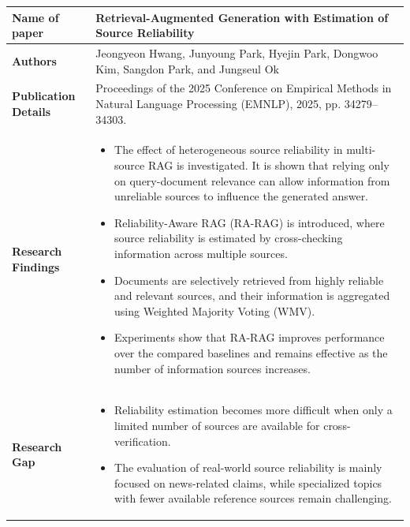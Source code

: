 \documentclass[12pt,a4paper]{report}
\begin{document}
\begin{longtable}{|p{1.25in}|p{5.15in}|}

\hline

\textbf{Name of paper} &
\textbf{Retrieval-Augmented Generation with Estimation of Source Reliability}
\\ \hline

\textbf{Authors} &
Jeongyeon Hwang, Junyoung Park, Hyejin Park, Dongwoo Kim, Sangdon Park, and Jungseul Ok
\\ \hline

\textbf{Publication Details} &
Proceedings of the 2025 Conference on Empirical Methods in Natural Language Processing (EMNLP), 2025, pp. 34279--34303.
\\ \hline

\textbf{Research Findings} &
\begin{itemize}[
    leftmargin=0.18in,
    itemsep=0.05in,
    topsep=0pt,
    parsep=0pt
]
    \item The effect of heterogeneous source reliability in multi-source RAG is investigated. It is shown that relying only on query-document relevance can allow information from unreliable sources to influence the generated answer.

    \item Reliability-Aware RAG (RA-RAG) is introduced, where source reliability is estimated by cross-checking information across multiple sources.

    \item Documents are selectively retrieved from highly reliable and relevant sources, and their information is aggregated using Weighted Majority Voting (WMV).

    \item Experiments show that RA-RAG improves performance over the compared baselines and remains effective as the number of information sources increases.
\end{itemize}
\\ \hline

\textbf{Research Gap} &
\begin{itemize}[
    leftmargin=0.18in,
    itemsep=0.05in,
    topsep=0pt,
    parsep=0pt
]
    \item Reliability estimation becomes more difficult when only a limited number of sources are available for cross-verification.

    \item The evaluation of real-world source reliability is mainly focused on news-related claims, while specialized topics with fewer available reference sources remain challenging.


\end{itemize}
\end{longtable}
\end{document}
